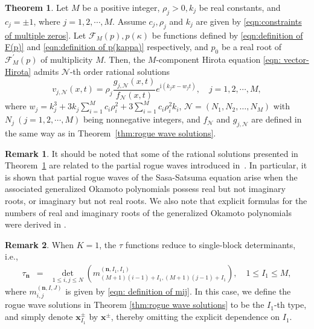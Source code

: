\documentclass[preprint,3p,10pt]{elsarticle}
\theoremstyle{definition}
\newtheorem{remark}{Remark}[section]
\newtheorem{theorem}{Theorem}[section]
\begin{document}
\begin{theorem}\label{thm:rational solutions}
Let $M$ be a positive integer,  $\rho_j >0, k_j$ be real constants, and $c_j=\pm1 $, where $j=1,2,\cdots,M$. Assume  $c_j, \rho_j $ and $ k_j$ are given by \eqref{eqn:constraints of multiple zeros}. Let $\mathcal{F}_M(p), p(\kappa)$ be functions defined by \eqref{eqn:definition of F(p)} and \eqref{eqn:definition of p(kappa)} respectively, and $p_0$ be a real root of $\mathcal{F}_M^{\prime}(p)$ of multiplicity $M$. Then, the $M$-component Hirota equation \eqref{eqn: vector-Hirota} admits $\mathcal{N}$-th order rational solutions 
\begin{equation} \label{eqn:N-order rational solutions of MHirota}
 v_{j,\mathcal{N}}(x,t) = \rho_{j}\frac{g_{j,\mathcal{N}}(x,t)}{f_{\mathcal{N}}(x,t)}  e^{\mathrm{i}\left(k_j x-w_j t\right)}, \quad j=1,2,\cdots,M,
\end{equation}
where  $w_j=k_j^3+3k_j\sum_{i=1}^{M}c_i \rho_i^2+3\sum_{i=1}^{M}c_i\rho_i^2 k_i$, $\mathcal{N} = \left(N_1, N_2, \ldots, N_M\right)$ with $N_j~(j=1,2,\cdots,M)$ being nonnegative integers,
and $f_{\mathcal{N}}$ and $g_{j,\mathcal{N}}$ are defined in the same way as in Theorem~\ref{thm:rogue wave solutions}.
\end{theorem}

\begin{remark}
    It should be noted that some of the rational solutions presented in Theorem~\ref{thm:rational solutions} are related to the partial rogue waves introduced in~\cite{Yang2023Yang}. In particular, it is shown that partial rogue waves of the Sasa-Satsuma equation arise when the associated generalized Okamoto polynomials possess real but not imaginary roots, or imaginary but not real roots. We also note that explicit formulas for the numbers of real and imaginary roots of the generalized Okamoto polynomials were derived in \cite{roffelsen2025real}.
\end{remark}

\begin{remark}
When $K=1$, the $\tau$ functions reduce to single-block determinants, i.e.,
\begin{eqnarray*}
\tau_{\mathbf{n}} &=& \det_{1 \leq i, j \leq N} \left(m_{(M+1)(i-1)+I_1,(M+1) (j-1)+I_1}^{(\mathbf{n},I_1, I_1)}\right), \quad 1 \leq I_1 \leq M,
\end{eqnarray*}
where $m_{i, j}^{(\mathbf{n},I, J)}$ is given by \eqref{eqn: definition of mij}.  In this case, we define the rogue wave solutions in Theorem \ref{thm:rogue wave solutions} to be the $I_1$-th type, and simply denote $\mathbf{x}_{I_1}^{\pm}$ by $\mathbf{x}^{\pm}$, thereby omitting the explicit dependence on $I_1$.
\end{remark}
\end{document}
